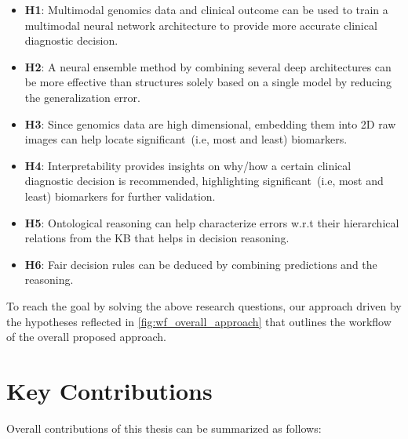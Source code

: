 \vspace{-2mm}
\begin{itemize}[noitemsep]
    \item \textbf{H1}: Multimodal genomics data and clinical outcome can be used to train a multimodal neural network architecture to provide more accurate clinical diagnostic decision. 
    \item \textbf{H2}: A neural ensemble method by combining several deep architectures can be more effective than structures solely based on a single model by reducing the generalization error. 
    \item \textbf{H3}: Since genomics data are high dimensional, embedding them into 2D raw images can help locate significant~(i.e, most and least) biomarkers. 
    \item \textbf{H4}: Interpretability provides insights on why/how a certain clinical diagnostic decision is recommended, highlighting significant~(i.e, most and least) biomarkers for further validation. 
    \item \textbf{H5}: Ontological reasoning can help characterize errors w.r.t their hierarchical relations from the KB that helps in decision reasoning.
    \item \textbf{H6}: Fair decision rules can be deduced by combining predictions and the reasoning. 
\end{itemize}
\vspace{-2mm}

\hspace*{3.5mm} To reach the goal by solving the above research questions, our approach driven by the hypotheses reflected in \cref{fig:wf_overall_approach} that outlines the workflow of the overall proposed approach.

\section{Key Contributions} \label{contributions}
Overall contributions of this thesis can be summarized as follows:

